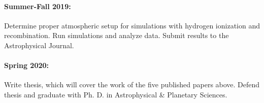 \documentclass[aasms,12pt]{article}
\begin{document}
\vspace{-0.4cm}
\paragraph{Summer-Fall 2019:} Determine proper atmospheric setup for simulations with
hydrogen ionization and recombination.  Run simulations and analyze data. Submit results
to the Astrophysical Journal.

\vspace{-0.4cm}
\paragraph{Spring 2020:} Write thesis, which will cover the work of the five published papers
above.  Defend thesis and graduate with Ph. D. in Astrophysical \& Planetary Sciences.
\end{document}
